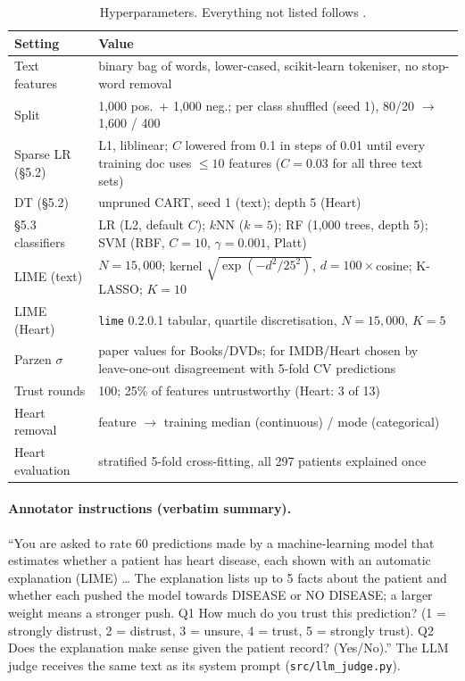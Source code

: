 \begin{table}[h]
\centering\small
\begin{tabular}{p{}p{}}
\toprule
Setting & Value \\
\midrule
Text features & binary bag of words, lower-cased, scikit-learn tokeniser, no stop-word removal \\
Split & 1,000 pos.\ + 1,000 neg.; per class shuffled (seed 1), 80/20 $\rightarrow$ 1,600 / 400 \\
Sparse LR (\S5.2) & L1, liblinear; $C$ lowered from 0.1 in steps of 0.01 until every training doc uses ${\le}10$ features ($C{=}0.03$ for all three text sets) \\
DT (\S5.2) & unpruned CART, seed 1 (text); depth 5 (Heart) \\
\S5.3 classifiers & LR (L2, default $C$); $k$NN ($k{=}5$); RF (1,000 trees, depth 5); SVM (RBF, $C{=}10$, $\gamma{=}0.001$, Platt) \\
LIME (text) & $N{=}15{,}000$; kernel $\sqrt{\exp(-d^2/25^2)}$, $d = 100\times$cosine; K-LASSO; $K{=}10$ \\
LIME (Heart) & \texttt{lime} 0.2.0.1 tabular, quartile discretisation, $N{=}15{,}000$, $K{=}5$ \\
Parzen $\sigma$ & paper values for Books/DVDs; for IMDB/Heart chosen by leave-one-out disagreement with 5-fold CV predictions \\
Trust rounds & 100; 25\% of features untrustworthy (Heart: 3 of 13) \\
Heart removal & feature $\rightarrow$ training median (continuous) / mode (categorical) \\
Heart evaluation & stratified 5-fold cross-fitting, all 297 patients explained once \\
\bottomrule
\end{tabular}
\caption{Hyperparameters. Everything not listed follows \citet{limeexperiments}.}
\label{tab:hyper}
\end{table}

\begin{table}[h]
\centering\small

\caption{LIME's precision and recall for the trustworthy class (\S5.3 protocol), mean over 100 rounds. Recall is consistently high on text. On Heart the lower recall means LIME flags too many trustworthy predictions as untrustworthy.}
\label{tab:prf}
\end{table}

\paragraph{Annotator instructions (verbatim summary).} ``You are asked to rate 60 predictions made by a machine-learning model that estimates whether a patient has heart disease, each shown with an automatic explanation (LIME) \ldots{} The explanation lists up to 5 facts about the patient and whether each pushed the model towards DISEASE or NO DISEASE; a larger weight means a stronger push. Q1 How much do you trust this prediction? (1 = strongly distrust, 2 = distrust, 3 = unsure, 4 = trust, 5 = strongly trust). Q2 Does the explanation make sense given the patient record? (Yes/No).'' The LLM judge receives the same text as its system prompt (\texttt{src/llm\_judge.py}).
